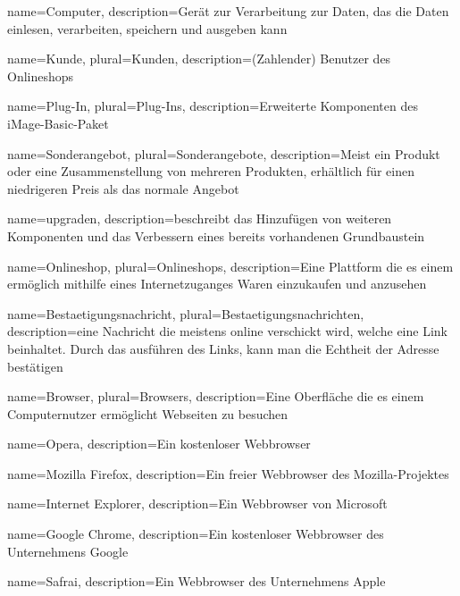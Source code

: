 \documentclass[parskip=full]{scrartcl}
\begin{document}
%
%
{
  name=Computer,
  description={Gerät zur Verarbeitung zur Daten, das die Daten einlesen, verarbeiten, speichern und ausgeben kann}
}

{
	name=Kunde,
	plural=Kunden,
	description={(Zahlender) Benutzer des Onlineshops}
}

{
	name=Plug-In,
	plural=Plug-Ins,
	description={Erweiterte Komponenten des iMage-Basic-Paket}
}

{
	name=Sonderangebot,
	plural=Sonderangebote,
	description={Meist ein Produkt oder eine Zusammenstellung von mehreren Produkten, erhältlich für einen niedrigeren Preis als das normale Angebot}
}

{
	name=upgraden,
	description={beschreibt das Hinzufügen von weiteren Komponenten und das Verbessern eines bereits vorhandenen Grundbaustein}
}

{
	name=Onlineshop,
	plural=Onlineshops,
	description={Eine Plattform die es einem ermöglich mithilfe eines Internetzuganges Waren einzukaufen und anzusehen}
}


{
	name=Bestaetigungsnachricht,
	plural=Bestaetigungsnachrichten,
	description={eine Nachricht die meistens online verschickt wird, welche eine Link beinhaltet. Durch das ausführen des Links, kann man die Echtheit der Adresse bestätigen}
}

{
	name=Browser,
	plural=Browsers,
	description={Eine Oberfläche die es einem \gls{Computer}nutzer ermöglicht Webseiten zu besuchen}
}

{
	name=Opera,
	description={Ein kostenloser Webbrowser}
}

{
	name=Mozilla Firefox,
	description={Ein freier Webbrowser des Mozilla-Projektes}
}

{
	name=Internet Explorer,
	description={Ein Webbrowser von Microsoft}
}

{
	name=Google Chrome,
	description={Ein kostenloser Webbrowser des Unternehmens Google}
}

{
	name=Safrai,
	description={Ein Webbrowser des Unternehmens Apple}
}
\end{document}
